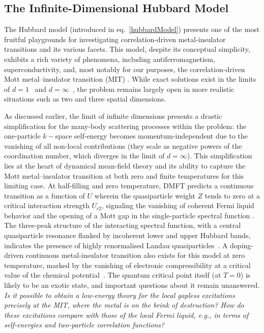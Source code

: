 \subsection{The Infinite-Dimensional Hubbard Model}
The Hubbard model (introduced in eq.~\ref{hubbardModel}) presents one of the most fruitful playgrounds for investigating correlation-driven metal-insulator transitions and its various facets. This model, despite its conceptual simplicity, exhibits a rich variety of phenomena, including antiferromagnetism, superconductivity, and, most notably for our purposes, the correlation-driven Mott metal–insulator transition (MIT) \cite{imada1998metal,tasaki_1998,arovas2022,qin2022}. While exact solutions exist in the limits of \(d=1\)~\cite{lieb1968absence} and \(d=\infty\)~\cite{georges_kotliar_1992}, the problem remains largely open in more realistic situations such as two and three spatial dimensions.

As discussed earlier, the limit of infinite dimensions presents a drastic simplification for the many-body scattering processes within the problem: the one-particle \(k-\)space self-energy becomes momentum-independent due to the vanishing of all non-local contributions (they scale as negative powers of the coordination number, which diverges in the limit of \(d=\infty\)). This simplification lies at the heart of dynamical mean-field theory and its ability to capture the Mott metal–insulator transition at both zero and finite temperatures for this limiting case\cite{georges_kotliar_1992,janis1992,rozenberg1994,georges1996,rozenberg1999,noack1999}. At half-filling and zero temperature, DMFT predicts a continuous transition as a function of $U$ wherein the quasiparticle weight $Z$ tends to zero at a critical interaction strength $U_{c2}$, signaling the vanishing of coherent Fermi liquid behavior and the opening of a Mott gap in the single-particle spectral function \cite{rozenberg1994,georges1996}. The three-peak structure of the interacting spectral function, with a central quasiparticle resonance flanked by incoherent lower and upper Hubbard bands, indicates the presence of highly renormalised Landau quasiparticles~\cite{rozenberg1994}. A doping-driven continuous metal-insulator transition also exists for this model at zero temperature, marked by the vanishing of electronic compressibility at a critical value of the chemical potential~\cite{werner2007}. The quantum critical point itself (at \(T=0\)) is likely to be an exotic state, and important questions about it remain unanswered. {\it Is it possible to obtain a low-energy theory for the local gapless excitations precisely at the MIT, where the metal is on the brink of destruction? How do these excitations compare with those of the local Fermi liquid, e.g., in terms of self-energies and two-particle correlation functions?}

